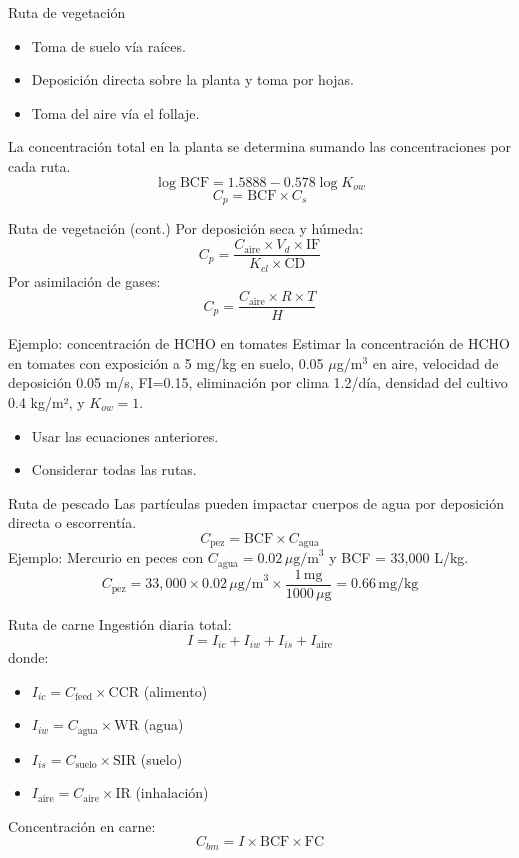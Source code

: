 \documentclass[10pt,compress]{beamer}
\begin{document}
\begin{frame}{Ruta de vegetación}
\begin{itemize}
\item Toma de suelo vía raíces.
\item Deposición directa sobre la planta y toma por hojas.
\item Toma del aire vía el follaje.
\end{itemize}
La concentración total en la planta se determina sumando las concentraciones por cada ruta.
\[
\log \text{BCF} = 1.5888 - 0.578 \log K_{ow}
\]
\[
C_p = \text{BCF} \times C_s
\]
\end{frame}

\begin{frame}{Ruta de vegetación (cont.)}
Por deposición seca y húmeda:
\[
C_p = \frac{C_{\text{aire}} \times V_d \times \text{IF}}{K_{cl} \times \text{CD}}
\]
Por asimilación de gases:
\[
C_p = \frac{C_{\text{aire}} \times R \times T}{H}
\]
\end{frame}

\begin{frame}{Ejemplo: concentración de HCHO en tomates}
Estimar la concentración de HCHO en tomates con exposición a 5 mg/kg en suelo, 0.05 $\mu$g/m$^3$ en aire, velocidad de deposición 0.05 m/s, FI=0.15, eliminación por clima 1.2/día, densidad del cultivo 0.4 kg/m², y \(K_{ow}=1\).
\begin{itemize}
\item Usar las ecuaciones anteriores.
\item Considerar todas las rutas.
\end{itemize}
\end{frame}

\begin{frame}{Ruta de pescado}
Las partículas pueden impactar cuerpos de agua por deposición directa o escorrentía.
\[
C_{\text{pez}} = \text{BCF} \times C_{\text{agua}}
\]
Ejemplo: Mercurio en peces con \(C_{\text{agua}} = 0.02 \, \mu\text{g/m}^3\) y BCF = 33,000 L/kg.
\[
C_{\text{pez}} = 33,000 \times 0.02 \, \mu\text{g/m}^3 \times \frac{1 \, \text{mg}}{1000 \, \mu\text{g}} = 0.66 \, \text{mg/kg}
\]
\end{frame}

\begin{frame}{Ruta de carne}
Ingestión diaria total:
\[
I = I_{ic} + I_{iw} + I_{is} + I_{\text{aire}}
\]
donde:
\begin{itemize}
\item \(I_{ic} = C_{\text{feed}} \times \text{CCR}\) (alimento)
\item \(I_{iw} = C_{\text{agua}} \times \text{WR}\) (agua)
\item \(I_{is} = C_{\text{suelo}} \times \text{SIR}\) (suelo)
\item \(I_{\text{aire}} = C_{\text{aire}} \times \text{IR}\) (inhalación)
\end{itemize}
Concentración en carne:
\[
C_{bm} = I \times \text{BCF} \times \text{FC}
\]
\end{frame}
\end{document}
